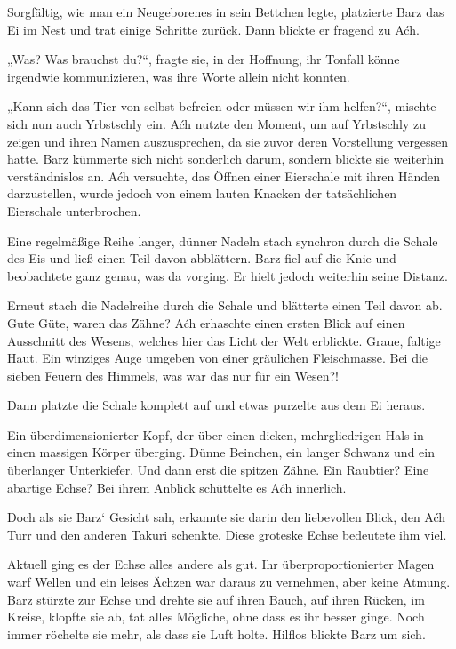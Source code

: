 Sorgfältig, wie man ein Neugeborenes in sein Bettchen legte, platzierte Barz das Ei im Nest und trat einige Schritte zurück. Dann blickte er fragend zu Aćh.

„Was? Was brauchst du?“, fragte sie, in der Hoffnung, ihr Tonfall könne irgendwie kommunizieren, was ihre Worte allein nicht konnten.

„Kann sich das Tier von selbst befreien oder müssen wir ihm helfen?“, mischte sich nun auch Yrbstschly ein. Aćh nutzte den Moment, um auf Yrbstschly zu zeigen und ihren Namen auszusprechen, da sie zuvor deren Vorstellung vergessen hatte. Barz kümmerte sich nicht sonderlich darum, sondern blickte sie weiterhin verständnislos an. Aćh versuchte, das Öffnen einer Eierschale mit ihren Händen darzustellen, wurde jedoch von einem lauten Knacken der tatsächlichen Eierschale unterbrochen.

Eine regelmäßige Reihe langer, dünner Nadeln stach synchron durch die Schale des Eis und ließ einen Teil davon abblättern. Barz fiel auf die Knie und beobachtete ganz genau, was da vorging. Er hielt jedoch weiterhin seine Distanz.

Erneut stach die Nadelreihe durch die Schale und blätterte einen Teil davon ab. Gute Güte, waren das Zähne? Aćh erhaschte einen ersten Blick auf einen Ausschnitt des Wesens, welches hier das Licht der Welt erblickte. Graue, faltige Haut. Ein winziges Auge umgeben von einer gräulichen Fleischmasse. Bei die sieben Feuern des Himmels, was war das nur für ein Wesen?!

Dann platzte die Schale komplett auf und etwas purzelte aus dem Ei heraus.

Ein überdimensionierter Kopf, der über einen dicken, mehrgliedrigen Hals in einen massigen Körper überging. Dünne Beinchen, ein langer Schwanz und ein überlanger Unterkiefer. Und dann erst die spitzen Zähne. Ein Raubtier? Eine abartige Echse? Bei ihrem Anblick schüttelte es Aćh innerlich.

Doch als sie Barz‘ Gesicht sah, erkannte sie darin den liebevollen Blick, den Aćh Turr und den anderen Takuri schenkte. Diese groteske Echse bedeutete ihm viel.

Aktuell ging es der Echse alles andere als gut. Ihr überproportionierter Magen warf Wellen und ein leises Ächzen war daraus zu vernehmen, aber keine Atmung. Barz stürzte zur Echse und drehte sie auf ihren Bauch, auf ihren Rücken, im Kreise, klopfte sie ab, tat alles Mögliche, ohne dass es ihr besser ginge. Noch immer röchelte sie mehr, als dass sie Luft holte. Hilflos blickte Barz um sich.

